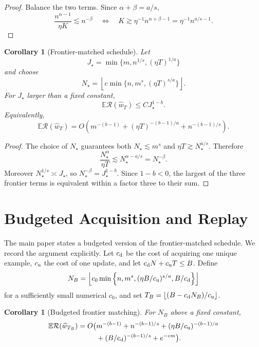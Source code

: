 \documentclass[letterpaper]{article}
\newtheorem{corollary}[theorem]{Corollary}
\newcommand{\E}{\mathbb E}
\newcommand{\R}{\mathcal R}
\newcommand{\1}{\mathbf 1}
\begin{document}
\begin{proof}
Balance the two terms. Since $\alpha+\beta=a/s$,
\[
\frac{n^{\alpha-1}}{\eta K}\lesssim n^{-\beta}
\quad\Longleftrightarrow\quad
K\gtrsim\eta^{-1}n^{\alpha+\beta-1}
=\eta^{-1}n^{a/s-1}.
\]
\end{proof}

\begin{corollary}[Frontier-matched schedule]
\label{cor:supp-full}
Let
\[
J_\star=\min\{m,n^{1/s},(\eta T)^{1/a}\}
\]
and choose
\[
N_\star=\left\lfloor
c\min\{n,m^s,(\eta T)^{s/a}\}
\right\rfloor.
\]
For $J_\star$ larger than a fixed constant,
\[
\E\R(\widehat w_T)
\le C J_\star^{1-b}.
\]
Equivalently,
\[
\E\R(\widehat w_T)
=O\left(
m^{-(b-1)}+(\eta T)^{-(b-1)/a}+n^{-(b-1)/s}
\right).
\]
\end{corollary}

\begin{proof}
The choice of $N_\star$ guarantees both $N_\star\lesssim m^s$ and
$\eta T\gtrsim N_\star^{a/s}$. Therefore
\[
\frac{N_\star^\alpha}{\eta T}
\lesssim N_\star^{\alpha-a/s}
=N_\star^{-\beta}.
\]
Moreover $N_\star^{1/s}\asymp J_\star$, so
$N_\star^{-\beta}=J_\star^{1-b}$. Since $1-b<0$, the largest of the three
frontier terms is equivalent within a factor three to their sum.
\end{proof}

\section{Budgeted Acquisition and Replay}

The main paper states a budgeted version of the frontier-matched schedule. We
record the argument explicitly. Let $c_{\rm d}$ be the cost of acquiring one
unique example, $c_{\rm u}$ the cost of one update, and let
$c_{\rm d}N+c_{\rm u}T\le B$. Define
\[
N_B=\left\lfloor c_0\min\left\{
 n,m^s,(\eta B/c_{\rm u})^{s/a},B/c_{\rm d}
\right\}\right\rfloor
\]
for a sufficiently small numerical $c_0$, and set
$T_B=\lfloor(B-c_{\rm d}N_B)/c_{\rm u}\rfloor$.

\begin{corollary}[Budgeted frontier matching]
For $N_B$ above a fixed constant,
\begin{align*}
\E\R(\widehat w_{T_B})=O\bigl(&m^{-(b-1)}+n^{-(b-1)/s}
 +(\eta B/c_{\rm u})^{-(b-1)/a}\\
&+(B/c_{\rm d})^{-(b-1)/s}+e^{-cm}\bigr).
\end{align*}
\end{corollary}
\end{document}
